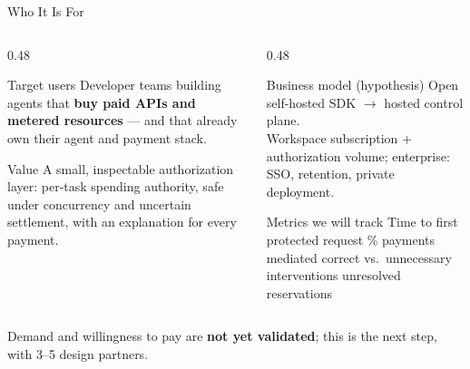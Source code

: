 \documentclass{beamer}
\begin{document}
\begin{frame}{Who It Is For}
\begin{columns}[T,onlytextwidth]
  \begin{column}{0.48\textwidth}
    \begin{block}{Target users}
      \footnotesize
      Developer teams building agents that \textbf{buy paid APIs and metered
      resources} --- and that already own their agent and payment stack.
    \end{block}
    \vspace{2mm}
    \begin{block}{Value}
      \footnotesize
      A small, inspectable authorization layer: per-task spending authority,
      safe under concurrency and uncertain settlement, with an explanation
      for every payment.
    \end{block}
  \end{column}
  \begin{column}{0.48\textwidth}
    \begin{block}{Business model (hypothesis)}
      \footnotesize
      Open self-hosted SDK \(\rightarrow\) hosted control plane.\\
      Workspace subscription + authorization volume;
      enterprise: SSO, retention, private deployment.
    \end{block}
    \vspace{2mm}
    \begin{block}{Metrics we will track}
      \footnotesize
      Time to first protected request \textbullet{} \% payments mediated
      \textbullet{} correct vs.\ unnecessary interventions \textbullet{}
      unresolved reservations
    \end{block}
  \end{column}
\end{columns}

\vspace{2mm}
\scriptsize\centering
Demand and willingness to pay are \textbf{not yet validated}; this is the next
step, with 3--5 design partners.
\end{frame}
\end{document}
